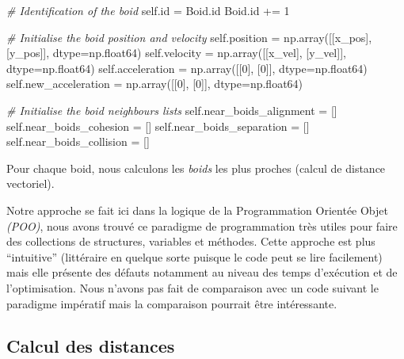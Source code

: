 \documentclass[
]{article}
\newenvironment{Shaded}{}{}
\newcommand{\BuiltInTok}[1]{#1}
\newcommand{\CommentTok}[1]{\textcolor[rgb]{0.38,0.63,0.69}{\textit{#1}}}
\newcommand{\DecValTok}[1]{\textcolor[rgb]{0.25,0.63,0.44}{#1}}
\newcommand{\NormalTok}[1]{#1}
\newcommand{\OperatorTok}[1]{\textcolor[rgb]{0.40,0.40,0.40}{#1}}
\newcommand{\VariableTok}[1]{\textcolor[rgb]{0.10,0.09,0.49}{#1}}
\begin{document}
\begin{Shaded}
\begin{Highlighting}[]
        \CommentTok{\# Identification of the boid}
        \VariableTok{self}\NormalTok{.}\BuiltInTok{id} \OperatorTok{=}\NormalTok{ Boid.}\BuiltInTok{id}
\NormalTok{        Boid.}\BuiltInTok{id} \OperatorTok{+=} \DecValTok{1}

        \CommentTok{\# Initialise the boid position and velocity}
        \VariableTok{self}\NormalTok{.position }\OperatorTok{=}\NormalTok{ np.array([[x\_pos], [y\_pos]], dtype}\OperatorTok{=}\NormalTok{np.float64)}
        \VariableTok{self}\NormalTok{.velocity }\OperatorTok{=}\NormalTok{ np.array([[x\_vel], [y\_vel]], dtype}\OperatorTok{=}\NormalTok{np.float64)}
        \VariableTok{self}\NormalTok{.acceleration }\OperatorTok{=}\NormalTok{ np.array([[}\DecValTok{0}\NormalTok{], [}\DecValTok{0}\NormalTok{]], dtype}\OperatorTok{=}\NormalTok{np.float64)}
        \VariableTok{self}\NormalTok{.new\_acceleration }\OperatorTok{=}\NormalTok{ np.array([[}\DecValTok{0}\NormalTok{], [}\DecValTok{0}\NormalTok{]], dtype}\OperatorTok{=}\NormalTok{np.float64)}

        \CommentTok{\# Initialise the boid neighbours lists}
        \VariableTok{self}\NormalTok{.near\_boids\_alignment }\OperatorTok{=}\NormalTok{ []}
        \VariableTok{self}\NormalTok{.near\_boids\_cohesion }\OperatorTok{=}\NormalTok{ []}
        \VariableTok{self}\NormalTok{.near\_boids\_separation }\OperatorTok{=}\NormalTok{ []}
        \VariableTok{self}\NormalTok{.near\_boids\_collision }\OperatorTok{=}\NormalTok{ []}
\end{Highlighting}
\end{Shaded}

Pour chaque boid, nous calculons les \emph{boids} les plus proches
(calcul de distance vectoriel).

Notre approche se fait ici dans la logique de la Programmation Orientée
Objet \emph{(POO)}, nous avons trouvé ce paradigme de programmation très
utiles pour faire des collections de structures, variables et méthodes.
Cette approche est plus ``intuitive'' (littéraire en quelque sorte
puisque le code peut se lire facilement) mais elle présente des défauts
notamment au niveau des temps d'exécution et de l'optimisation. Nous
n'avons pas fait de comparaison avec un code suivant le paradigme
impératif mais la comparaison pourrait être intéressante.

\hypertarget{calcul-des-distances}{%
\subsection{Calcul des distances}\label{calcul-des-distances}}
\end{document}
